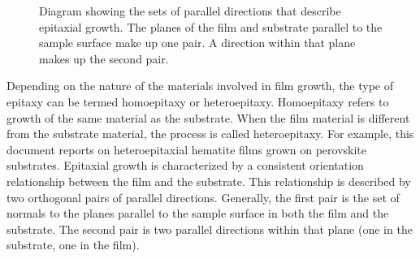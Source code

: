 \documentclass[12pt,%
              twoside,
               letterpaper]{uiothesis}
\begin{document}
\begin{figure}
\begin{center}
\caption[Orientation relationships in epitaxy]{%
	Diagram showing the sets of parallel directions that describe epitaxial 
	growth. The planes of the film and substrate parallel to the sample surface
	make up one pair. A direction within that plane makes up the second pair. }
\label{fig:epitaxy}
\end{center}
\end{figure}
Depending on the nature of the materials involved in film growth, the type of epitaxy can
be termed homoepitaxy or heteroepitaxy. Homoepitaxy refers to growth of the same material
as the substrate. When the film material is different from the substrate material, the
process is called heteroepitaxy. For example, this document reports on heteroepitaxial
hematite films grown on perovskite substrates. Epitaxial growth is characterized by a
consistent orientation relationship between the film and the substrate. This relationship
is described by two orthogonal pairs of parallel directions. Generally, the first pair is
the set of normals to the planes parallel to the sample surface in both the film and the
substrate. The second pair is two parallel directions within that plane (one in the
substrate, one in the film). 
\end{document}
